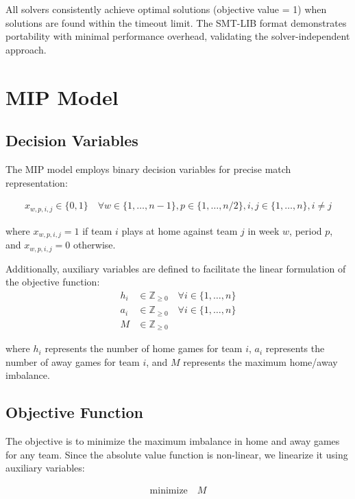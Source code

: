 \documentclass[11pt]{article}
\begin{document}
All solvers consistently achieve optimal solutions (objective value = 1) when solutions are found within the timeout limit. The SMT-LIB format demonstrates portability with minimal performance overhead, validating the solver-independent approach.

\section{MIP Model}

\subsection{Decision Variables}

The MIP model employs binary decision variables for precise match representation:

\begin{align}
x_{w,p,i,j} \in \{0,1\} \quad \forall w \in \{1, \ldots, n-1\}, p \in \{1, \ldots, n/2\}, i,j \in \{1, \ldots, n\}, i \neq j
\end{align}

where $x_{w,p,i,j} = 1$ if team $i$ plays at home against team $j$ in week $w$, period $p$, and $x_{w,p,i,j} = 0$ otherwise.

Additionally, auxiliary variables are defined to facilitate the linear formulation of the objective function:
\begin{align}
h_i &\in \mathbb{Z}_{\geq 0} \quad \forall i \in \{1, \ldots, n\} \\
a_i &\in \mathbb{Z}_{\geq 0} \quad \forall i \in \{1, \ldots, n\} \\
M &\in \mathbb{Z}_{\geq 0}
\end{align}

where $h_i$ represents the number of home games for team $i$, $a_i$ represents the number of away games for team $i$, and $M$ represents the maximum home/away imbalance.

\subsection{Objective Function}

The objective is to minimize the maximum imbalance in home and away games for any team. Since the absolute value function is non-linear, we linearize it using auxiliary variables:

\begin{align}
\text{minimize} \quad M
\end{align}
\end{document}
